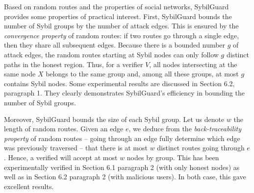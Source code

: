 \documentclass[a4paper,11pt]{article}
\begin{document}




Based on random routes and the properties of social networks,
SybilGuard provides some properties of practical interest. First,
SybilGuard bounds the number of Sybil groups by the number of attack
edges.  This is ensured by the \emph{convergence property} of random
routes: if two routes go through a single edge, then they share all
subsequent edges.  Because there is a bounded number $g$ of attack
edges, the random routes starting at Sybil nodes can only follow $g$
distinct paths in the honest region.  Thus, for a verifier $V$, all
nodes intersecting at the same node $X$ belongs to the same group and,
among all these groups, at most $g$ contains Sybil nodes. Some
experimental results are discussed in Section 6.2, paragraph 1. They
clearly demonstrates SybilGuard's efficiency in bounding the number of
Sybil groups.

Moreover, SybilGuard bounds the size of each Sybil group. Let us
denote $w$ the length of random routes.  Given an edge $e$, we deduce
from the \emph{back-traceability property} of random routes -- going
through an edge fully determine which edge was previously traversed --
that there is at most $w$ distinct routes going through $e$.  Hence, a
verified will accept at most $w$ nodes by group. This has been
experimentally verified in Section 6.1 paragraph 2 (with only honest
nodes) as well as in Section 6.2 paragraph 2 (with malicious
users). In both case, this gave excellent results.
\end{document}
